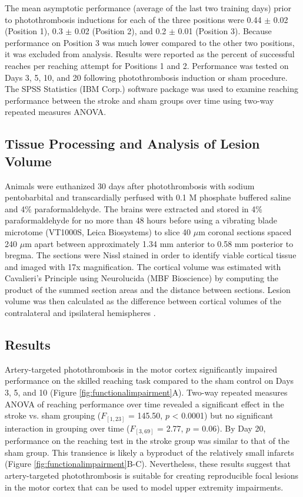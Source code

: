 The mean asymptotic performance (average of the last two training days) prior to photothrombosis inductions for each of the three positions were 0.44 $\pm$ 0.02 (Position 1), 0.3 $\pm$ 0.02 (Position 2), and 0.2 $\pm$ 0.01 (Position 3). Because performance on Position 3 was much lower compared to the other two positions, it was excluded from analysis. Results were reported as the percent of successful reaches per reaching attempt for Positions 1 and 2. Performance was tested on Days 3, 5, 10, and 20 following photothrombosis induction or sham procedure. The SPSS Statistics (IBM Corp.) software package was used to examine reaching performance between the stroke and sham groups over time using two-way repeated measures ANOVA.

\subsection{Tissue Processing and Analysis of Lesion Volume}

Animals were euthanized 30 days after photothrombosis with sodium pentobarbital and transcardially perfused with 0.1 M phosphate buffered saline and 4\% paraformaldehyde. The brains were extracted and stored in 4\% paraformaldehyde for no more than 48 hours before using a vibrating blade microtome (VT1000S, Leica Biosystems) to slice 40 $\mu$m coronal sections spaced 240 $\mu$m apart between approximately 1.34 mm anterior to 0.58 mm posterior to bregma. The sections were Nissl stained in order to identify viable cortical tissue and imaged with 17x magnification. The cortical volume was estimated with Cavalieri's Principle \cite{Rosen:1990bf} using Neurolucida (MBF Bioscience) by computing the product of the summed section areas and the distance between sections. Lesion volume was then calculated as the difference between cortical volumes of the contralateral and ipsilateral hemispheres \cite{Tennant:2011cx}.

\subsection{Results}

Artery-targeted photothrombosis in the motor cortex significantly impaired performance on the skilled reaching task compared to the sham control on Days 3, 5, and 10 (Figure \ref{fig:functionalimpairment}A). Two-way repeated measures ANOVA of reaching performance over time revealed a significant effect in the stroke vs. sham grouping ($F_{[1,23]}$ = 145.50, $p$ \textless{} 0.0001) but no significant interaction in grouping over time ($F_{[3,69]}$ = 2.77, $p$ = 0.06). By Day 20, performance on the reaching test in the stroke group was similar to that of the sham group. This transience is likely a byproduct of the relatively small infarcts (Figure \ref{fig:functionalimpairment}B-C). Nevertheless, these results suggest that artery-targeted photothrombosis is suitable for creating reproducible focal lesions in the motor cortex that can be used to model upper extremity impairments.

